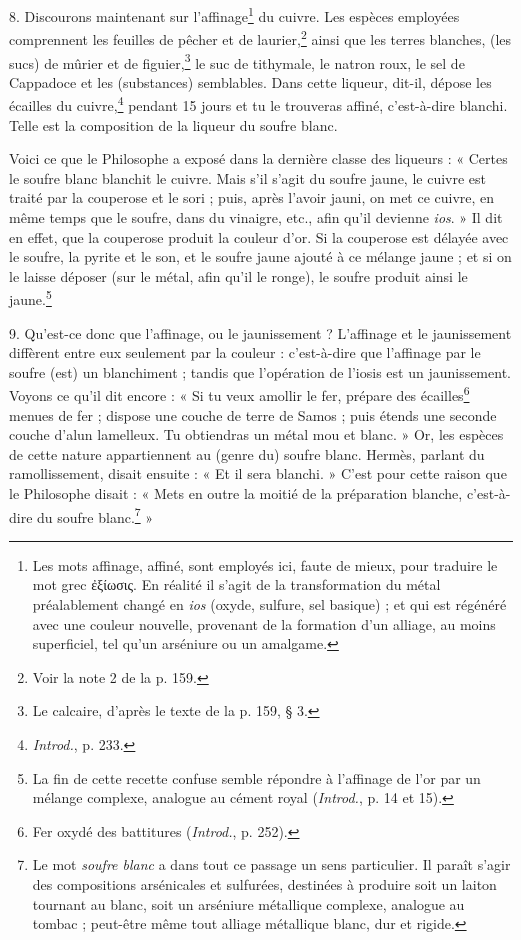 \documentclass[a4paper, 11pt, oneside, polutonikogreek, french]{article}
\begin{document}
8. Discourons maintenant sur l'affinage\footnote{Les mots affinage, affiné, sont employés ici, faute de mieux, pour traduire le mot grec ἐξίωσις. En réalité il s'agit de la transformation du métal préalablement changé en \emph{ios} (oxyde, sulfure, sel basique) ; et qui est régénéré avec une couleur nouvelle, provenant de la formation d'un alliage, au moins superficiel, tel qu'un arséniure ou un amalgame.} du cuivre. Les espèces employées comprennent les feuilles de pêcher et de laurier,\footnote{Voir la note 2 de la p. 159.} ainsi que les terres blanches, (les sucs) de mûrier et de figuier,\footnote{Le calcaire, d'après le texte de la p. 159, § 3.} le suc de tithymale, le natron roux, le sel de Cappadoce et les (substances) semblables. Dans cette liqueur, dit-il, dépose les écailles du cuivre,\footnote{\emph{Introd.}, p. 233.} pendant 15 jours et tu le trouveras affiné, c'est-à-dire blanchi. Telle est la composition de la liqueur du soufre blanc.

Voici ce que le Philosophe a exposé dans la dernière classe des liqueurs : « Certes le soufre blanc blanchit le cuivre. Mais s'il s'agit du soufre jaune, le cuivre est traité par la couperose et le sori ; puis, après l'avoir jauni, on met ce cuivre, en même temps que le soufre, dans du vinaigre, etc., afin qu'il devienne \emph{ios}. » Il dit en effet, que la couperose produit la couleur d'or. Si la couperose est délayée avec le soufre, la pyrite et le son, et le soufre jaune ajouté à ce mélange jaune ; et si on le laisse déposer (sur le métal, afin qu'il le ronge), le soufre produit ainsi le jaune.\footnote{La fin de cette recette confuse semble répondre à l'affinage de l'or par un mélange complexe, analogue au cément royal (\emph{Introd.}, p. 14 et 15).}

9. Qu'est-ce donc que l'affinage, ou le jaunissement ? L'affinage et le jaunissement diffèrent entre eux seulement par la couleur : c'est-à-dire que l'affinage par le soufre (est) un blanchiment ; tandis que l'opération de l'iosis est un jaunissement. Voyons ce qu'il dit encore : « Si tu veux amollir le fer, prépare des écailles\footnote{Fer oxydé des battitures (\emph{Introd.}, p. 252).} menues de fer ; dispose une couche de terre de Samos ; puis étends une seconde couche d'alun lamelleux. Tu obtiendras un métal mou et blanc. » Or, les espèces de cette nature appartiennent au (genre du) soufre blanc. Hermès, parlant du ramollissement, disait ensuite : « Et il sera blanchi. » C'est pour cette raison que le Philosophe disait : « Mets en outre la moitié de la préparation blanche, c'est-à-dire du soufre blanc.\footnote{Le mot \emph{soufre blanc} a dans tout ce passage un sens particulier. Il paraît s'agir des compositions arsénicales et sulfurées, destinées à produire soit un laiton tournant au blanc, soit un arséniure métallique complexe, analogue au tombac ; peut-être même tout alliage métallique blanc, dur et rigide.} »
\end{document}
